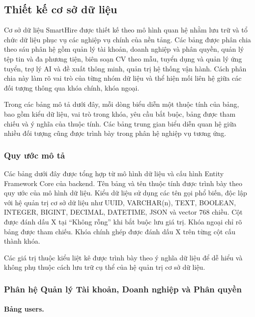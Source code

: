 
\subsection{Thiết kế cơ sở dữ liệu}

Cơ sở dữ liệu SmartHire được thiết kế theo mô hình quan hệ nhằm lưu trữ và tổ chức dữ liệu phục vụ các nghiệp vụ chính của nền tảng. Các bảng được phân chia theo sáu phân hệ gồm quản lý tài khoản, doanh nghiệp và phân quyền, quản lý tệp tin và đa phương tiện, biên soạn CV theo mẫu, tuyển dụng và quản lý ứng tuyển, trợ lý AI và đề xuất thông minh, quản trị hệ thống vận hành. Cách phân chia này làm rõ vai trò của từng nhóm dữ liệu và thể hiện mối liên hệ giữa các đối tượng thông qua khóa chính, khóa ngoại.

Trong các bảng mô tả dưới đây, mỗi dòng biểu diễn một thuộc tính của bảng, bao gồm kiểu dữ liệu, vai trò trong khóa, yêu cầu bắt buộc, bảng được tham chiếu và ý nghĩa của thuộc tính. Các bảng trung gian biểu diễn quan hệ giữa nhiều đối tượng cũng được trình bày trong phân hệ nghiệp vụ tương ứng.

\subsubsection{Quy ước mô tả}

Các bảng dưới đây được tổng hợp từ mô hình dữ liệu và cấu hình Entity Framework Core của backend. Tên bảng và tên thuộc tính được trình bày theo quy ước của mô hình dữ liệu. Kiểu dữ liệu sử dụng các tên gọi phổ biến, độc lập với hệ quản trị cơ sở dữ liệu như UUID, VARCHAR(n), TEXT, BOOLEAN, INTEGER, BIGINT, DECIMAL, DATETIME, JSON và vector 768 chiều. Cột được đánh dấu X tại “Không rỗng” khi bắt buộc lưu giá trị. Khóa ngoại chỉ rõ bảng được tham chiếu. Khóa chính ghép được đánh dấu X trên từng cột cấu thành khóa.

Các giá trị thuộc kiểu liệt kê được trình bày theo ý nghĩa dữ liệu để dễ hiểu và không phụ thuộc cách lưu trữ cụ thể của hệ quản trị cơ sở dữ liệu.

\subsubsection{Phân hệ Quản lý Tài khoản, Doanh nghiệp và Phân quyền}

\paragraph{Bảng users.}

